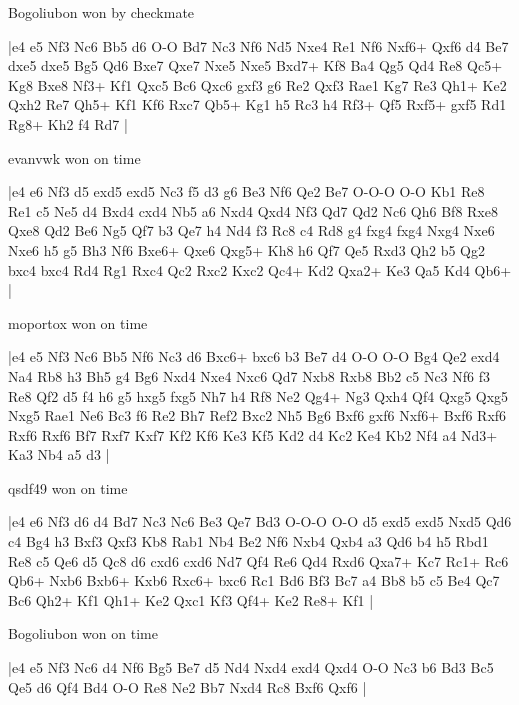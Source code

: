 \showboard

Bogoliubon won by checkmate

\makegametitle
|e4 e5 Nf3 Nc6 Bb5 d6 O-O Bd7 Nc3 Nf6 Nd5 Nxe4 Re1 Nf6 Nxf6+ Qxf6 d4 Be7 dxe5 dxe5 Bg5 Qd6 Bxe7 Qxe7 Nxe5 Nxe5 Bxd7+ Kf8 Ba4 Qg5 Qd4 Re8 Qc5+ Kg8 Bxe8 Nf3+ Kf1 Qxc5 Bc6 Qxc6 gxf3 g6 Re2 Qxf3 Rae1 Kg7 Re3 Qh1+ Ke2 Qxh2 Re7 Qh5+ Kf1 Kf6 Rxc7 Qb5+ Kg1 h5 Rc3 h4 Rf3+ Qf5 Rxf5+ gxf5 Rd1 Rg8+ Kh2 f4 Rd7  |

\showboard

evanvwk won on time

\makegametitle
|e4 e6 Nf3 d5 exd5 exd5 Nc3 f5 d3 g6 Be3 Nf6 Qe2 Be7 O-O-O O-O Kb1 Re8 Re1 c5 Ne5 d4 Bxd4 cxd4 Nb5 a6 Nxd4 Qxd4 Nf3 Qd7 Qd2 Nc6 Qh6 Bf8 Rxe8 Qxe8 Qd2 Be6 Ng5 Qf7 b3 Qe7 h4 Nd4 f3 Rc8 c4 Rd8 g4 fxg4 fxg4 Nxg4 Nxe6 Nxe6 h5 g5 Bh3 Nf6 Bxe6+ Qxe6 Qxg5+ Kh8 h6 Qf7 Qe5 Rxd3 Qh2 b5 Qg2 bxc4 bxc4 Rd4 Rg1 Rxc4 Qc2 Rxc2 Kxc2 Qc4+ Kd2 Qxa2+ Ke3 Qa5 Kd4 Qb6+  |

\showboard

moportox won on time

\makegametitle
|e4 e5 Nf3 Nc6 Bb5 Nf6 Nc3 d6 Bxc6+ bxc6 b3 Be7 d4 O-O O-O Bg4 Qe2 exd4 Na4 Rb8 h3 Bh5 g4 Bg6 Nxd4 Nxe4 Nxc6 Qd7 Nxb8 Rxb8 Bb2 c5 Nc3 Nf6 f3 Re8 Qf2 d5 f4 h6 g5 hxg5 fxg5 Nh7 h4 Rf8 Ne2 Qg4+ Ng3 Qxh4 Qf4 Qxg5 Qxg5 Nxg5 Rae1 Ne6 Bc3 f6 Re2 Bh7 Ref2 Bxc2 Nh5 Bg6 Bxf6 gxf6 Nxf6+ Bxf6 Rxf6 Rxf6 Rxf6 Bf7 Rxf7 Kxf7 Kf2 Kf6 Ke3 Kf5 Kd2 d4 Kc2 Ke4 Kb2 Nf4 a4 Nd3+ Ka3 Nb4 a5 d3  |

\showboard

qsdf49 won on time

\makegametitle
|e4 e6 Nf3 d6 d4 Bd7 Nc3 Nc6 Be3 Qe7 Bd3 O-O-O O-O d5 exd5 exd5 Nxd5 Qd6 c4 Bg4 h3 Bxf3 Qxf3 Kb8 Rab1 Nb4 Be2 Nf6 Nxb4 Qxb4 a3 Qd6 b4 h5 Rbd1 Re8 c5 Qe6 d5 Qc8 d6 cxd6 cxd6 Nd7 Qf4 Re6 Qd4 Rxd6 Qxa7+ Kc7 Rc1+ Rc6 Qb6+ Nxb6 Bxb6+ Kxb6 Rxc6+ bxc6 Rc1 Bd6 Bf3 Bc7 a4 Bb8 b5 c5 Be4 Qc7 Bc6 Qh2+ Kf1 Qh1+ Ke2 Qxc1 Kf3 Qf4+ Ke2 Re8+ Kf1  |

\showboard

Bogoliubon won on time

\makegametitle
|e4 e5 Nf3 Nc6 d4 Nf6 Bg5 Be7 d5 Nd4 Nxd4 exd4 Qxd4 O-O Nc3 b6 Bd3 Bc5 Qe5 d6 Qf4 Bd4 O-O Re8 Ne2 Bb7 Nxd4 Rc8 Bxf6 Qxf6  |

